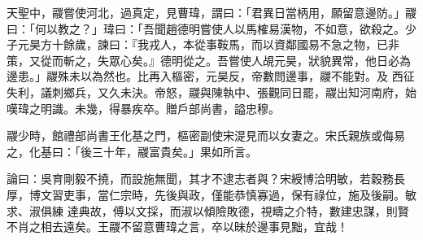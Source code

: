 \begin{pinyinscope}
 天聖中，鬷嘗使河北，過真定，見曹瑋，謂曰：「君異日當柄用，願留意邊防。」鬷曰：「何以教之？」瑋曰：「吾聞趙德明嘗使人以馬榷易漢物，不如意，欲殺之。少子元昊方十餘歲，諫曰：『我戎人，本從事鞍馬，而以資鄰國易不急之物，已非策，又從而斬之，失眾心矣。』德明從之。吾嘗使人覘元昊，狀貌異常，他日必為邊患。」鬷殊未以為然也。比再入樞密，元昊反，帝數問邊事，鬷不能對。及
 西征失利，議刺鄉兵，又久未決。帝怒，鬷與陳執中、張觀同日罷，鬷出知河南府，始嘆瑋之明識。未幾，得暴疾卒。贈戶部尚書，謚忠穆。



 鬷少時，館禮部尚書王化基之門，樞密副使宋湜見而以女妻之。宋氏親族或侮易之，化基曰：「後三十年，鬷富貴矣。」果如所言。



 論曰：吳育剛毅不撓，而設施無聞，其才不逮志者與？宋綬博洽明敏，若穀務長厚，博文習吏事，當仁宗時，先後與政，僅能恭慎寡過，保有祿位，施及後嗣。敏求、淑俱練
 達典故，傅以文採，而淑以傾險敗德，視疇之介特，數建忠謀，則賢不肖之相去遠矣。王鬷不留意曹瑋之言，卒以昧於邊事見黜，宜哉！



\end{pinyinscope}